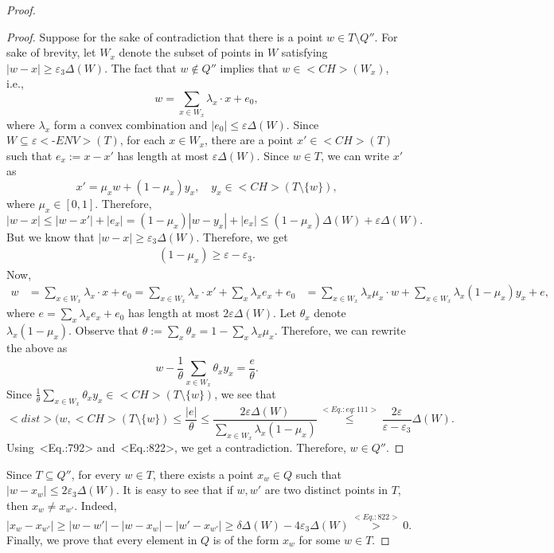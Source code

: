 \documentclass[11pt,letterpaper]{article}
\newcounter{note}[section]
\def\\{}%
\def\mathsf#1{<#1>}%
\def\eqref#1{<Eq.:#1>}%
\theoremstyle{definition}
\theoremstyle{remark}
\newcommand{\dist}{{\mathsf{dist}}}
\newcommand{\ch}{{\mathsf{CH}}}
\newcommand{\dia}{\Delta}
\newcommand{\eenv}{{\varepsilon{{\mathsf{\mbox{-}ENV}}}}}
\begin{document}
\begin{proof}
\begin{proof}
Suppose for the sake of contradiction that there is a point $w \in T \setminus Q''$.  For sake of brevity, let $W_x$ denote the subset of points in $W$ satisfying $|w-x|  \geq \varepsilon_3 \dia(W)$. The fact that $w \notin Q''$ implies that $w \in \ch(W_x)$, i.e., 
$$ w = \sum_{x \in W_x} \lambda_x \cdot x + e_0, $$
where $\lambda_x$ form a convex combination and $|e_0| \leq \varepsilon \dia(W).$ Since $W \subseteq \eenv(T)$, for each $x \in W_x$, there are a point $x' \in \ch(T)$ such that $e_x := x-x'$ has length at most $\varepsilon \dia(W)$. Since $w \in T$, we can write $x'$ as 
$$ x' = \mu_x w + (1-\mu_x) y_x, \quad y_x \in \ch(T \setminus \{w\}), $$
where $\mu_x \in [0,1]$. 
Therefore, 
$$ |w-x| \leq |w-x'| + |e_x| = (1-\mu_x) |w-y_x| + |e_x| \leq (1-\mu_x) \dia(W) + \varepsilon \dia(W). $$
But we know that $|w-x| \geq \varepsilon_3 \dia(W)$. Therefore, we get
\begin{align}
\label{eq:111}
(1- \mu_x) \geq \varepsilon - \varepsilon_3. 
\end{align}
Now, 
\begin{align*}
w & = \sum_{x \in W_x} \lambda_x \cdot x + e_0 = \sum_{x \in W_x} \lambda_x \cdot x' + \sum_x \lambda_x e_x + e_0 \\
& = \sum_{x \in W_x} \lambda_x \mu_x \cdot w + \sum_{x \in W_x} \lambda_x (1 - \mu_x) y_x + e,  
\end{align*}
where $e = \sum_x \lambda_x e_x + e_0$ has length at most $2\varepsilon \dia(W)$. 
Let $\theta_x$ denote $\lambda_x(1-\mu_x)$. Observe that $\theta:= \sum_x \theta_x = 1 - \sum_x \lambda_x \mu_x$. Therefore, we can rewrite the above as 
$$ w - \frac{1}{\theta} \sum_{x \in W_x} \theta_x y_x = \frac{e}{\theta}. $$
Since $\frac{1}{\theta} \sum_{x \in W_x} \theta_x y_x \in \ch(T \setminus \{w\})$, we see that 
$$ \dist(w, \ch(T \setminus \{w\}) \leq \frac{|e|}{\theta} \leq 
\frac{2\varepsilon \dia(W)}{\sum_{x \in W_x} \lambda_x (1-\mu_x)} 
\stackrel{\eqref{eq:111}}{\leq} \frac{2\varepsilon}{\varepsilon-\varepsilon_3} \dia(W). $$
Using~\eqref{792} and~\eqref{822}, we get a contradiction. Therefore, $w \in Q''$. 
\end{proof}

Since $T \subseteq Q''$, for every $w \in T$, there exists a point $x_w \in Q$ such that $|w-x_w| \leq 2 \varepsilon_3 \dia(W). $ It is easy to see that if $w, w'$ are two distinct points in $T$, then $x_w \neq x_{w'}$. Indeed, 
$$ |x_w - x_{w'}| \geq |w-w'| - |w-x_w| - |w'-x_{w'}| \geq \delta \dia(W) - 4 \varepsilon_3 \dia(W) \stackrel{\eqref{822}}{>} 0. $$
Finally, we prove that every element in $Q$ is of the form $x_w$ for some $w \in T$. 


\end{proof}
\end{document}
